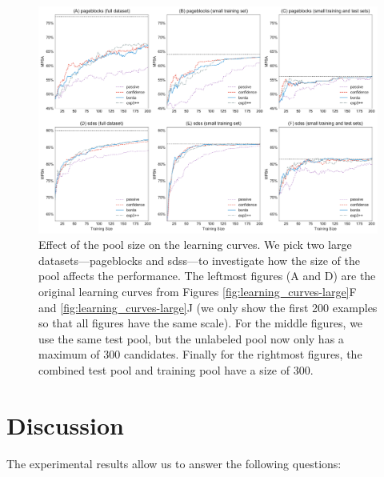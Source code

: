 \documentclass[fleqn,10pt,lineno]{wlpeerj} %
\begin{document}
\begin{figure}[tbp]
	\centering
	\includegraphics[width=\textwidth]{Fig12}
	\caption[Effect of the pool size]{Effect of the pool size on the learning
	curves. We pick two large datasets---pageblocks and sdss---to investigate
	how the size of the pool affects the performance. The leftmost figures (A
	and D) are the original learning curves from Figures
	\ref{fig:learning_curves-large}F and \ref{fig:learning_curves-large}J (we
	only show the first 200 examples so that all figures have the same scale).
	For the middle figures, we use the same test pool, but the unlabeled pool
	now only has a maximum of 300 candidates. Finally for the rightmost
	figures, the combined test pool and training pool have a size of 300.}
	\label{fig:learning-curves-pool-size}
\end{figure}

\section{Discussion}\label{sec:discussion}

The experimental results allow us to answer the following questions:
\end{document}
